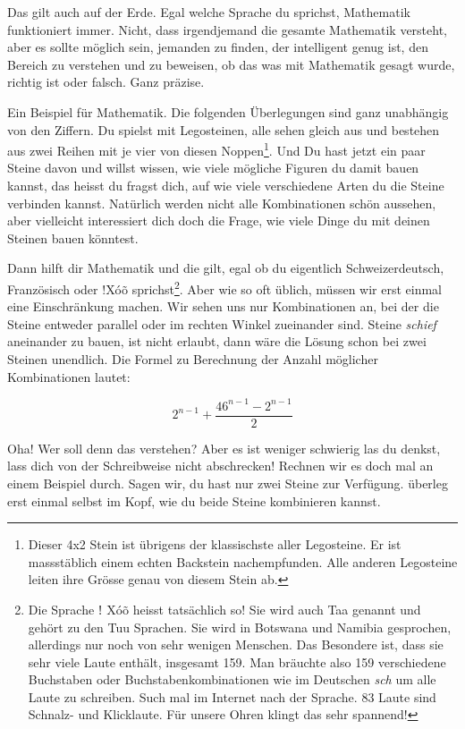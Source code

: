 Das gilt auch auf der Erde. Egal welche Sprache du sprichst, Mathematik funktioniert immer. Nicht, dass irgendjemand die gesamte Mathematik versteht, aber es sollte möglich sein, jemanden zu finden, der intelligent genug ist, den Bereich zu verstehen und zu beweisen, ob das was mit Mathematik gesagt wurde, richtig ist oder falsch. Ganz präzise.

Ein Beispiel für Mathematik. Die folgenden Überlegungen sind ganz unabhängig von den Ziffern. Du spielst mit Legosteinen, alle sehen gleich aus und bestehen aus zwei Reihen mit je vier von diesen Noppen\footnote{Dieser 4x2 Stein ist übrigens der klassischste aller Legosteine. Er ist massstäblich einem echten Backstein nachempfunden. Alle anderen Legosteine leiten ihre Grösse genau von diesem Stein ab.}. Und Du hast jetzt ein paar Steine davon und willst wissen, wie viele mögliche Figuren du damit bauen kannst, das heisst du fragst dich, auf wie viele verschiedene Arten du die Steine verbinden kannst. Natürlich werden nicht alle Kombinationen schön aussehen, aber vielleicht interessiert dich doch die Frage, wie viele Dinge du mit deinen Steinen bauen könntest.

Dann hilft dir Mathematik und die gilt, egal ob du eigentlich Schweizerdeutsch, Französisch oder $!$X\'{o}\~{o} sprichst\footnote{Die Sprache ǃ X\'{o}\~{o} heisst tatsächlich so! Sie wird auch Taa genannt und gehört zu den Tuu Sprachen. Sie wird in Botswana und Namibia gesprochen, allerdings nur noch von sehr wenigen Menschen. Das Besondere ist, dass sie sehr viele Laute enthält, insgesamt 159. Man bräuchte also 159 verschiedene Buchstaben oder Buchstabenkombinationen wie im Deutschen \textit{sch} um alle Laute zu schreiben. Such mal im Internet nach der Sprache. 83 Laute sind Schnalz- und Klicklaute. Für unsere Ohren klingt das sehr spannend!}. Aber wie so oft üblich, müssen wir erst einmal eine Einschränkung machen. Wir sehen uns nur Kombinationen an, bei der die Steine entweder parallel oder im rechten Winkel zueinander sind. Steine \textit{schief} aneinander zu bauen, ist nicht erlaubt, dann wäre die Lösung schon bei zwei Steinen unendlich. Die Formel zu Berechnung der Anzahl möglicher Kombinationen lautet:

$$2^{n-1}+\frac{46^{n-1}-2^{n-1}}{2}$$

Oha! Wer soll denn das verstehen? Aber es ist weniger schwierig las du denkst, lass dich von der Schreibweise nicht abschrecken! Rechnen wir es doch mal an einem Beispiel durch. Sagen wir, du hast nur zwei Steine zur Verfügung. überleg erst einmal selbst im Kopf, wie du beide Steine kombinieren kannst.

